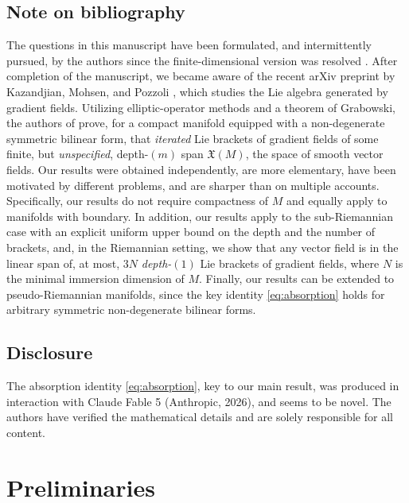 \documentclass{article}
\theoremstyle{remark}
\newcommand{\M}{M}
\newcommand{\X}{\mathfrak{X}(\M)}
\begin{document}
\subsection*{Note on bibliography}
%
The questions in this manuscript have been formulated, and intermittently pursued, by the authors since the finite-dimensional version was resolved \cite{AbdelgalilGeorgiou2024,AbdelgalilGeorgiou2025,AbdelgalilGeorgiou2026}. After completion of the manuscript, we became aware of the recent arXiv preprint by Kazandjian,
Mohsen, and Pozzoli \cite{KazandjianMohsenPozzoli2026}, which studies the Lie algebra generated by gradient fields.  Utilizing elliptic-operator methods and a theorem of Grabowski, the authors of \cite{KazandjianMohsenPozzoli2026} prove, for a compact manifold equipped with a non-degenerate symmetric
bilinear form, that \emph{iterated} Lie brackets of gradient fields of some finite, but \emph{unspecified}, depth-$(m)$ span $\X$, the space of smooth vector fields. 
%
Our results were obtained independently, are more elementary, have been motivated by different problems, and are sharper than \cite{KazandjianMohsenPozzoli2026} on multiple accounts. Specifically, our results do not require compactness of $\M$ and equally apply to manifolds with boundary. In addition, our results apply to the sub-Riemannian case with an explicit uniform upper bound on the depth and the number of brackets, and, in the Riemannian setting, we show that any vector field is in the linear span of, at most, $3N$ \emph{depth-$(1)$} Lie brackets of gradient fields, where $N$ is the minimal immersion dimension of $\M$. Finally, our results can be extended to pseudo-Riemannian manifolds, since the key identity \eqref{eq:absorption} holds for arbitrary symmetric non-degenerate bilinear forms. 


\subsection*{Disclosure}
%
The absorption identity \eqref{eq:absorption}, key to our main result, was produced in interaction with Claude Fable 5 (Anthropic, 2026), and seems to be novel. The authors have verified the mathematical details and are solely responsible for all content.

\section{Preliminaries}
\end{document}
